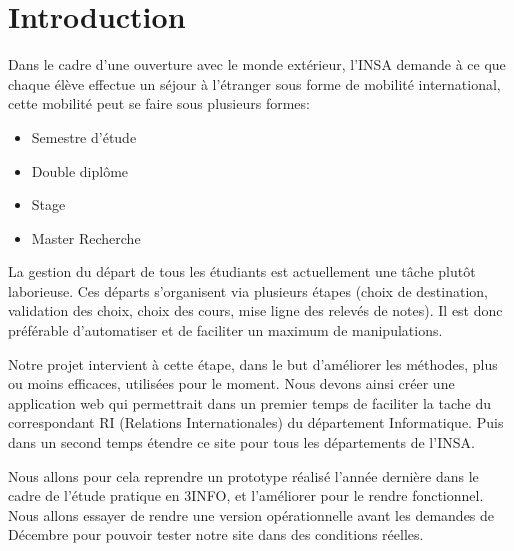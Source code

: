 \chapter*{Introduction}
Dans le cadre d'une ouverture avec le monde extérieur, l'INSA demande à ce que chaque élève effectue un séjour à l’étranger sous forme de mobilité international, cette mobilité peut se faire sous plusieurs formes:
\begin{itemize}
\item Semestre d'étude
\item Double diplôme
\item Stage
\item Master Recherche
\end{itemize}

La gestion du départ de tous les étudiants est actuellement une tâche plutôt laborieuse.
Ces départs s'organisent via plusieurs étapes (choix de destination, validation des choix, choix des cours, mise ligne des relevés de notes). Il est donc préférable d'automatiser et de faciliter un maximum de manipulations.

Notre projet intervient à cette étape, dans le but d'améliorer les méthodes, plus ou moins efficaces, utilisées pour le moment. Nous devons ainsi créer une application web qui permettrait dans un premier temps de faciliter la tache du correspondant RI (Relations Internationales) du département Informatique. Puis dans un second temps étendre ce site pour tous les départements de l'INSA.

Nous allons pour cela reprendre un prototype réalisé l'année dernière dans le cadre de l'étude pratique en 3INFO, et l'améliorer pour le rendre fonctionnel.
Nous allons essayer de rendre une version opérationnelle avant les demandes de Décembre pour pouvoir tester notre site dans des conditions réelles.
